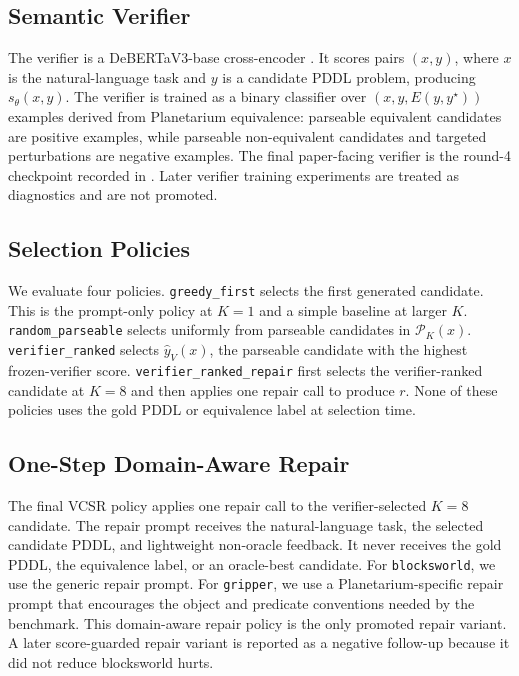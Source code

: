 \documentclass[11pt]{article}
\newcommand{\vcsr}{\textsc{VCSR}\xspace}
\newcommand{\pddl}{\textsc{PDDL}\xspace}
\begin{document}
\subsection{Semantic Verifier}

The verifier is a DeBERTaV3-base cross-encoder \citep{he2021debertav3}. It
scores pairs $(x,y)$, where $x$ is the natural-language task and $y$ is a
candidate \pddl problem, producing \(s_\theta(x,y)\). The verifier is trained
as a binary classifier over \((x,y,E(y,y^\star))\) examples derived from
Planetarium equivalence: parseable equivalent candidates are positive examples,
while parseable non-equivalent candidates and targeted perturbations are
negative examples. The final paper-facing verifier is the round-4 checkpoint
recorded in
. Later verifier training
experiments are treated as diagnostics and are not promoted.

\subsection{Selection Policies}

We evaluate four policies. \texttt{greedy\_first} selects the first generated
candidate. This is the prompt-only policy at $K=1$ and a simple baseline at
larger $K$. \texttt{random\_parseable} selects uniformly from parseable
candidates in \(\mathcal{P}_K(x)\). \texttt{verifier\_ranked} selects
\(\hat{y}_V(x)\), the parseable candidate with the highest frozen-verifier
score. \texttt{verifier\_ranked\_repair} first selects the verifier-ranked
candidate at $K=8$ and then applies one repair call to produce \(r\). None of
these policies uses the gold \pddl or equivalence label at selection time.

\subsection{One-Step Domain-Aware Repair}

The final \vcsr policy applies one repair call to the verifier-selected $K=8$
candidate. The repair prompt receives the natural-language task, the selected
candidate \pddl, and lightweight non-oracle feedback. It never receives the
gold \pddl, the equivalence label, or an oracle-best candidate. For
\texttt{blocksworld}, we use the generic repair prompt. For \texttt{gripper},
we use a Planetarium-specific repair prompt that encourages the object and
predicate conventions needed by the benchmark. This domain-aware repair policy
is the only promoted repair variant. A later score-guarded repair variant is
reported as a negative follow-up because it did not reduce blocksworld hurts.
\end{document}
